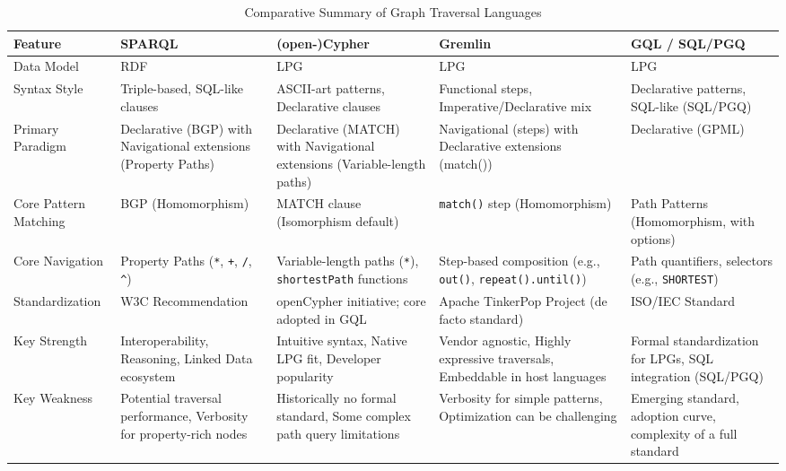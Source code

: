 \documentclass[sigconf,natbib=false]{acmart}
\begin{document}
\begin{table*}
	\centering
	\caption{Comparative Summary of Graph Traversal Languages}
	\label{tab:summaryGraphLanguages}
	\begin{tabulary}{\linewidth}{|L||L|L|L|L|} %
		\hline
		\textbf{Feature} & \textbf{SPARQL} & \textbf{(open-)Cypher} & \textbf{Gremlin} & \textbf{GQL / SQL/PGQ} \\
		\hline
		Data Model & RDF & LPG & LPG & LPG \\
		\hline
		Syntax Style & Triple-based, SQL-like clauses & ASCII-art patterns, Declarative clauses & Functional steps, Imperative/Declarative mix & Declarative patterns, SQL-like (SQL/PGQ) \\
		\hline
		Primary Paradigm & Declarative (BGP) with Navigational extensions (Property Paths) & Declarative (MATCH) with Navigational extensions (Variable-length paths) & Navigational (steps) with Declarative extensions (match()) & Declarative (GPML) \\
		\hline
		Core Pattern Matching & BGP (Homomorphism) & MATCH clause (Isomorphism default) & \texttt{match()} step (Homomorphism) & Path Patterns (Homomorphism, with options) \\
		\hline
		Core Navigation & Property Paths (\texttt{*}, \texttt{+}, \texttt{/}, \texttt{\^}) & Variable-length paths (\texttt{*}), \texttt{shortestPath} functions & Step-based composition (e.g., \texttt{out()}, \texttt{repeat().until()}) & Path quantifiers, selectors (e.g., \texttt{SHORTEST}) \\
		\hline
		Standardization & W3C Recommendation & openCypher initiative; core adopted in GQL & Apache TinkerPop Project (de facto standard) & ISO/IEC Standard \\
		\hline
		Key Strength & Interoperability, Reasoning, Linked Data ecosystem & Intuitive syntax, Native LPG fit, Developer popularity & Vendor agnostic, Highly expressive traversals, Embeddable in host languages & Formal standardization for LPGs, SQL integration (SQL/PGQ) \\
		\hline
		Key Weakness & Potential traversal performance, Verbosity for property-rich nodes & Historically no formal standard, Some complex path query limitations & Verbosity for simple patterns, Optimization can be challenging & Emerging standard, adoption curve, complexity of a full standard \\
		\hline
	\end{tabulary}
\end{table*}
\end{document}
